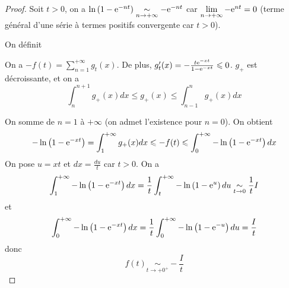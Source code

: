 \begin{proof}
    Soit $t>0$, on a $\ln\left(1-\mathrm{e}^{-nt}\right)\underset{n\to+\infty}{\sim}-\mathrm{e}^{-nt}$ car $\lim\limits_{n\to+\infty}-\mathrm{e}^{nt}=0$ (terme général d'une série à termes positifs convergente car $t>0$).

    On définit 

    On a $-f(t)=\sum_{n=1}^{+\infty}g_{t}(x)$. De plus, $g_{t}'(x)=-\frac{t\mathrm{e}^{-xt}}{1-\mathrm{e}^{-xt}}\leqslant0$. $g_{+}$ est décroissante, et on a 
    \begin{equation}
        \int_{n}^{n+1}g_{+}(x)dx\leqslant g_{+}(x)\leqslant\int_{n-1}^{n}g_{+}(x)dx
    \end{equation}

    On somme de $n=1$ à $+\infty$ (on admet l'existence pour $n=0$). On obtient
    \begin{equation}
        -\ln\left(1-\mathrm{e}^{-xt}\right)=\int_{1}^{+\infty}g_{+}(x)dx\leqslant -f(t)\leqslant\int_{0}^{+\infty}-\ln\left(1-\mathrm{e}^{-xt}\right)dx
    \end{equation}
    On pose $u=xt$ et $dx=\frac{du}{t}$ car $t>0$. On a 
    \begin{equation}
        \int_{1}^{+\infty}-\ln\left(1-\mathrm{e}^{-xt}\right)dx=\frac{1}{t}\int_{t}^{+\infty}-\ln\left(1-\mathrm{e}^{u}\right)du\underset{t\to0}{\sim}\frac{1}{t}I
    \end{equation}
    et 
    \begin{equation}
        \int_{0}^{+\infty}-\ln\left(1-\mathrm{e}^{-xt}\right)dx=\frac{1}{t}\int_{0}^{+\infty}-\ln\left(1-\mathrm{e}^{-u}\right)du=\frac{I}{t}
    \end{equation}
    donc 
    \begin{equation}
        \boxed{
            f(t)\underset{t\to+0^{+}}{\sim}-\frac{I}{t}
        }
    \end{equation}
\end{proof}

